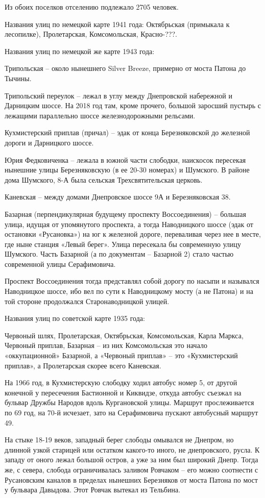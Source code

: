 Из обоих поселков отселению подлежало 2705 человек.

Названия улиц по немецкой карте 1941 года: Октябрьская (примыкала к лесопилке), Пролетарская, Комсомольская, Красно-???.

Названия улиц по немецкой же карте 1943 года: 

Трипольская – около нынешнего Silver Breeze, примерно от моста Патона до Тычины. 

Трипольский переулок – лежал в углу между Днепровской набережной и Дарницким шоссе. На 2018 год там, кроме прочего, большой заросший пустырь с лежащими параллельно шоссе железнодорожными рельсами.

Кухмистерский приплав (причал) – эдак от конца Березняковской до железной дороги и Дарницкого шоссе. 

Юрия Федковиченка – лежала в южной части слободки, наискосок пересекая нынешние улицы Березняковскую (в ее 20-30 номерах) и Шумского. В районе дома Шумского, 8-А была сельская Трехсвятительская церковь. 

Каневская – между домами Днепровское шоссе 9А и Березняковская 38. 

Базарная (перпендикулярная будущему проспекту Воссоединения) – большая улица, идущая от упомянутого проспекта, а тогда Наводницкого шоссе (эдак от остановки «Русановка») на юг к железной дороге, переваливая через нее в месте, где ныне станция «Левый берег». Улица пересекала бы современную улицу Шумского. Часть Базарной (а по документам – Базарной 2) стало частью современной улицы Серафимовича.

Проспект Воссоединения тогда представлял собой дорогу по насыпи и назывался Наводницкое шоссе, ибо вел по сути к Наводницкому мосту (а не Патона) и на той стороне продолжался Старонаводницкой улицей.

Названия улиц по советской карте 1935 года:

Червоный шлях, Пролетарская, Октябрьская, Комсомольская, Карла Маркса, Червоный приплав, Базарная – из них Комсомольская это начало «оккупационной» Базарной, а «Червоный приплав» – это «Кухмистерский приплав», а Пролетарская скорее всего Каневская.

На 1966 год, в Кухмистерскую слободку ходил автобус номер 5, от другой конечной у пересечения Бастионной и Киквидзе, откуда автобус съезжал на бульвар Дружбы Народов вдоль Кургановской улицы. Маршрут прослеживается по 69 год, на 70-й исчезает, зато на Серафимовича пускают автобусный маршрут 49.

На стыке 18-19 веков, западный берег слободы омывался не Днепром, но длинной узкой старицей или остатком какого-то иного, не днепровского, русла. К западу от оного лежал большой остров, а уже за ним был широкий Днепр. Тогда же, с севера, слобода ограничивалась заливом Ровчаком – его можно соотнести с Русановским каналов в пределах нынешних Березняков от моста Патона по мост у бульвара Давыдова. Этот Ровчак вытекал из Тельбина. 

